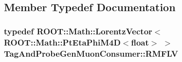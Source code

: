 \subsection{Member Typedef Documentation}
\hypertarget{classTagAndProbeGenMuonConsumer_a9d0961398ed938ff6169fabc39c6393d}{
\subsubsection[{RMFLV}]{\setlength{\rightskip}{0pt plus 5cm}typedef ROOT::Math::LorentzVector$<$ROOT::Math::PtEtaPhiM4D$<$float$>$ $>$ {\bf TagAndProbeGenMuonConsumer::RMFLV}}}
\label{classTagAndProbeGenMuonConsumer_a9d0961398ed938ff6169fabc39c6393d}



